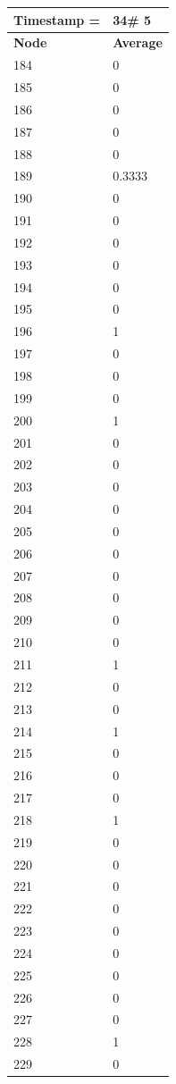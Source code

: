 \begin{tabular}{|l||l|}
\hline
\textbf{Timestamp =} & \textbf{34}\# 5\\\hline
	\textbf{Node} & \textbf{Average} \\ \hline
\hline
	184 & 0 \\ \hline
	185 & 0 \\ \hline
	186 & 0 \\ \hline
	187 & 0 \\ \hline
	188 & 0 \\ \hline
	189 & 0.3333 \\ \hline
	190 & 0 \\ \hline
	191 & 0 \\ \hline
	192 & 0 \\ \hline
	193 & 0 \\ \hline
	194 & 0 \\ \hline
	195 & 0 \\ \hline
	196 & 1 \\ \hline
	197 & 0 \\ \hline
	198 & 0 \\ \hline
	199 & 0 \\ \hline
	200 & 1 \\ \hline
	201 & 0 \\ \hline
	202 & 0 \\ \hline
	203 & 0 \\ \hline
	204 & 0 \\ \hline
	205 & 0 \\ \hline
	206 & 0 \\ \hline
	207 & 0 \\ \hline
	208 & 0 \\ \hline
	209 & 0 \\ \hline
	210 & 0 \\ \hline
	211 & 1 \\ \hline
	212 & 0 \\ \hline
	213 & 0 \\ \hline
	214 & 1 \\ \hline
	215 & 0 \\ \hline
	216 & 0 \\ \hline
	217 & 0 \\ \hline
	218 & 1 \\ \hline
	219 & 0 \\ \hline
	220 & 0 \\ \hline
	221 & 0 \\ \hline
	222 & 0 \\ \hline
	223 & 0 \\ \hline
	224 & 0 \\ \hline
	225 & 0 \\ \hline
	226 & 0 \\ \hline
	227 & 0 \\ \hline
	228 & 1 \\ \hline
	229 & 0 \\ \hline
\end{tabular}
